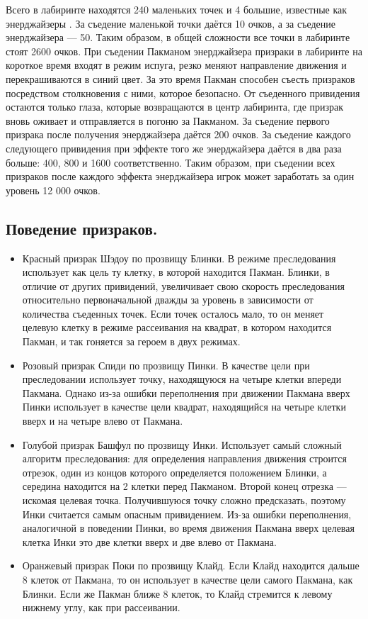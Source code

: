 Всего в лабиринте находятся 240 маленьких точек и 4 большие, известные как энерджайзеры . За съедение маленькой точки даётся 10 очков, а за съедение энерджайзера — 50. Таким образом, в общей сложности все точки в лабиринте стоят 2600 очков. При съедении Пакманом энерджайзера призраки в лабиринте на короткое время входят в режим испуга, резко меняют направление движения и перекрашиваются в синий цвет. За это время Пакман способен съесть призраков посредством столкновения с ними, которое безопасно. От съеденного привидения остаются только глаза, которые возвращаются в центр лабиринта, где призрак вновь оживает и отправляется в погоню за Пакманом. За съедение первого призрака после получения энерджайзера даётся 200 очков. За съедение каждого следующего привидения при эффекте того же энерджайзера даётся в два раза больше: 400, 800 и 1600 соответственно. Таким образом, при съедении всех призраков после каждого эффекта энерджайзера игрок может заработать за один уровень 12 000 очков.

\subsection{\label{subsec:ch01/sec04/subsec03}Поведение призраков.}
\begin{itemize}
	\item Красный призрак Шэдоу по прозвищу Блинки. В режиме преследования использует как цель ту клетку, в которой находится Пакман. Блинки, в отличие от других привидений, увеличивает свою скорость преследования относительно первоначальной дважды за уровень в зависимости от количества съеденных точек. Если точек осталось мало, то он меняет целевую клетку в режиме рассеивания на квадрат, в котором находится Пакман, и так гоняется за героем в двух режимах.
	\item Розовый призрак Спиди по прозвищу Пинки. В качестве цели при преследовании использует точку, находящуюся на четыре клетки впереди Пакмана. Однако из-за ошибки переполнения при движении Пакмана вверх Пинки использует в качестве цели квадрат, находящийся на четыре клетки вверх и на четыре влево от Пакмана.
	\item Голубой призрак Башфул по прозвищу Инки. Использует самый сложный алгоритм преследования: для определения направления движения строится отрезок, один из концов которого определяется положением Блинки, а середина находится на 2 клетки перед Пакманом. Второй конец отрезка --- искомая целевая точка. Получившуюся точку сложно предсказать, поэтому Инки считается самым опасным привидением. Из-за ошибки переполнения, аналогичной в поведении Пинки, во время движения Пакмана вверх целевая клетка Инки это две клетки вверх и две влево от Пакмана.
	\item Оранжевый призрак Поки по прозвищу Клайд. Если Клайд находится дальше 8 клеток от Пакмана, то он использует в качестве цели самого Пакмана, как Блинки. Если же Пакман ближе 8 клеток, то Клайд стремится к левому нижнему углу, как при рассеивании.
\end{itemize}


